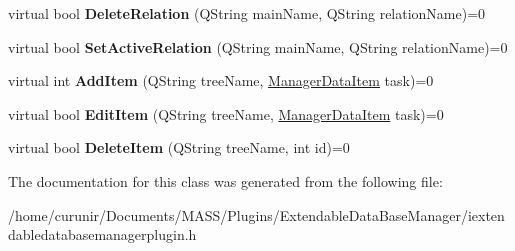 \begin{DoxyCompactItemize}
\item 
virtual bool {\bfseries Delete\+Relation} (Q\+String main\+Name, Q\+String relation\+Name)=0\hypertarget{class_i_extendable_data_base_manager_plugin_af0b43211e9399964c707ac337c219f8d}{}\label{class_i_extendable_data_base_manager_plugin_af0b43211e9399964c707ac337c219f8d}

\item 
virtual bool {\bfseries Set\+Active\+Relation} (Q\+String main\+Name, Q\+String relation\+Name)=0\hypertarget{class_i_extendable_data_base_manager_plugin_a20b67985093680372a1c14aa29481e42}{}\label{class_i_extendable_data_base_manager_plugin_a20b67985093680372a1c14aa29481e42}

\item 
virtual int {\bfseries Add\+Item} (Q\+String tree\+Name, \hyperlink{class_i_extendable_data_base_manager_plugin_1_1_manager_data_item}{Manager\+Data\+Item} task)=0\hypertarget{class_i_extendable_data_base_manager_plugin_a0b44f850dabdb3d4cd985c1000f0d6d9}{}\label{class_i_extendable_data_base_manager_plugin_a0b44f850dabdb3d4cd985c1000f0d6d9}

\item 
virtual bool {\bfseries Edit\+Item} (Q\+String tree\+Name, \hyperlink{class_i_extendable_data_base_manager_plugin_1_1_manager_data_item}{Manager\+Data\+Item} task)=0\hypertarget{class_i_extendable_data_base_manager_plugin_a45c9c133b47f3babe95ccfe53489f193}{}\label{class_i_extendable_data_base_manager_plugin_a45c9c133b47f3babe95ccfe53489f193}

\item 
virtual bool {\bfseries Delete\+Item} (Q\+String tree\+Name, int id)=0\hypertarget{class_i_extendable_data_base_manager_plugin_aaa311e2c898b0e974e27ee0efae1716e}{}\label{class_i_extendable_data_base_manager_plugin_aaa311e2c898b0e974e27ee0efae1716e}

\end{DoxyCompactItemize}


The documentation for this class was generated from the following file\+:\begin{DoxyCompactItemize}
\item 
/home/curunir/\+Documents/\+M\+A\+S\+S/\+Plugins/\+Extendable\+Data\+Base\+Manager/iextendabledatabasemanagerplugin.\+h\end{DoxyCompactItemize}
